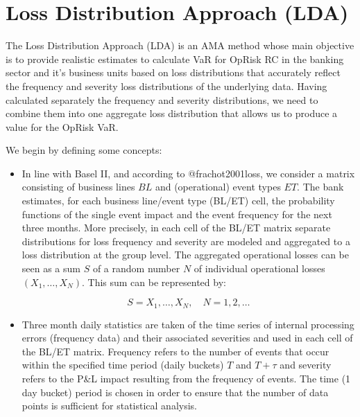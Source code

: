 \documentclass{DissertateUSU}
\begin{document}
\section{Loss Distribution Approach (LDA)}
\label{sec:Loss Distribution Approach (LDA)}

The Loss Distribution Approach (LDA) is an AMA method whose main
objective is to provide realistic estimates to calculate VaR for OpRisk
RC in the banking sector and it's business units based on loss
distributions that accurately reflect the frequency and severity loss
distributions of the underlying data. Having calculated separately the
frequency and severity distributions, we need to combine them into one
aggregate loss distribution that allows us to produce a value for the
OpRisk VaR. \medskip

We begin by defining some concepts:

\begin{itemize}
\item In line with Basel II, and according to @frachot2001loss, we consider a matrix consisting of business lines $BL$ and (operational) event types $ET$. The bank estimates, for each business line/event type (BL/ET) cell, the probability functions of the single event impact and the event frequency for the next three months. More precisely, in each cell of the BL/ET matrix separate distributions for loss frequency and severity are modeled and aggregated to a loss distribution at the group level. The aggregated operational losses can be seen as a sum $S$ of a random number $N$ of individual operational losses \begin{math} (X_1, \ldots, X_N )\end{math}. This sum can be represented by:

\singlespacing
\begin{equation}\label{eqn1}
S = X_1, \ldots, X_N ,\quad N = 1, 2, \ldots 
\end{equation}
\doublespacing

\item Three month daily statistics are taken of the time series of internal processing errors (frequency data) and their associated severities and used in each cell of the BL/ET matrix. Frequency refers to the number of events that occur within the specified time period (daily buckets) $T$ and $T + \tau$ and severity refers to the P\&L impact resulting from the frequency of events. The time (1 day bucket) period is chosen in order to ensure that the number of data points is sufficient for statistical analysis.
\end{itemize}
\end{document}
